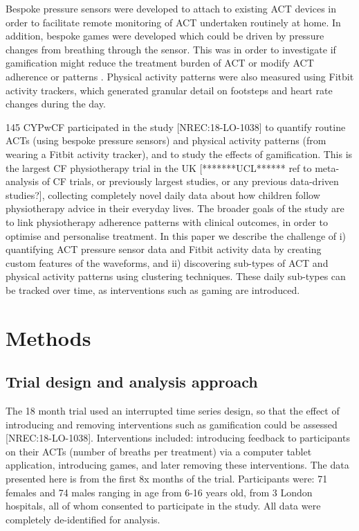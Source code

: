 \documentclass{article}
\begin{document}
Bespoke pressure sensors were developed to attach to existing ACT devices in order to facilitate remote monitoring of ACT undertaken routinely at home. In addition, bespoke games were developed which could be driven by pressure changes from breathing through the sensor. This was in order to investigate if gamification might reduce the treatment burden of ACT or modify ACT adherence or patterns \cite{Jackson2019} \cite{[Anonymised]2019} . Physical activity patterns were also measured using Fitbit activity trackers, which generated granular detail on footsteps and heart rate changes during the day. 

 145 CYPwCF participated in the study [NREC:18-LO-1038] to quantify routine ACTs (using bespoke pressure sensors) and physical activity patterns (from wearing a Fitbit activity tracker), and to study the effects of gamification. This is the largest CF physiotherapy trial in the UK [*******UCL****** ref to meta-analysis of CF trials, or previously largest studies, or any previous data-driven studies?], collecting completely novel daily data about how children follow physiotherapy advice in their everyday lives. The broader goals of the study are to link physiotherapy adherence patterns with clinical outcomes, in order to optimise and personalise treatment. In this paper we describe the challenge of i) quantifying ACT pressure sensor data and Fitbit activity data by creating custom features of the waveforms, and ii) discovering sub-types of ACT and physical activity patterns using clustering techniques. These daily sub-types can be tracked over time, as interventions such as gaming are introduced.  
 
\section{Methods}

\subsection{Trial design and analysis approach}

The 18 month trial used an interrupted time series design, so that the effect of introducing and removing interventions such as gamification could be assessed [NREC:18-LO-1038]. Interventions included: introducing feedback to participants on their ACTs (number of breaths per treatment) via a computer tablet application, introducing games, and later removing these interventions. The data presented here is from the first 8x months of the trial. Participants were: 71 females and 74 males ranging in age from 6-16 years old, from 3 London hospitals, all of whom consented to participate in the study. All data were completely de-identified for analysis. 
 
\end{document}
